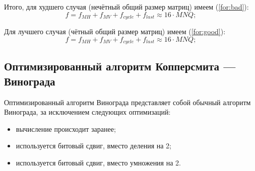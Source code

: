 Итого, для худшего случая (нечётный общий размер матриц) имеем (\ref{for:bad}):
\begin{equation}
	\label{for:bad}
	f =  f_{MH} + f_{MV} + f_{cycle} + f_{last}\approx 16 \cdot MNQ;
\end{equation}

Для лучшего случая (чётный общий размер матриц) имеем (\ref{for:good}):
\begin{equation}
	\label{for:good}
	f =  f_{MH} + f_{MV} + f_{cycle} + f_{last} \approx 16 \cdot MNQ;
\end{equation}


\subsection{Оптимизированный алгоритм Копперсмита — Винограда}

Оптимизированный алгоритм Винограда представляет собой обычный алгоритм Винограда, за исключением следующих оптимизаций:
\begin{itemize}
	\item вычисление происходит заранее;
	\item используется битовый сдвиг, вместо деления на 2;
	\item используется битовый сдвиг, вместо умножения на 2.
\end{itemize}



